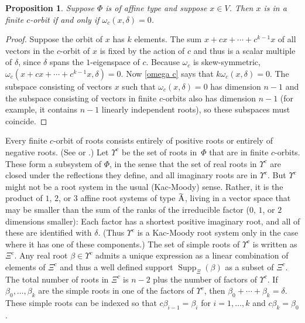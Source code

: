 \documentclass{amsart}
\newtheorem{proposition}{Proposition}[section]
\theoremstyle{definition}
\theoremstyle{remark}
\numberwithin{equation}{section}
\newcommand{\0}{{\mathbf{0}}}
\newcommand{\RSChar}{\Phi}
\newcommand{\RS}{\RSChar}
\newcommand{\RSTChar}{\Upsilon}
\newcommand{\RST}[1]{\RSTChar^{#1}}
\newcommand{\SimplesTChar}{\Xi}
\newcommand{\SimplesT}[1]{\SimplesTChar^{#1}}
\newcommand{\SuppT}{\operatorname{Supp}_\SimplesTChar}
\newcommand{\afftype}[1]{{\widetilde{\raisebox{0pt}[6pt][0pt]{#1}}}}
\newcommand{\sayN}[1]{\say[N]{#1}}
\begin{document}

\begin{proposition}\label{om del fin}
Suppose $\RS$ is of affine type and suppose $x\in V$.
Then $x$ is in a finite $c$-orbit if and only if $\omega_c(x,\delta)=0$.
\end{proposition}
\begin{proof}
Suppose the orbit of $x$ has $k$ elements.
The sum $x+cx+\cdots+c^{k-1}x$ of all vectors in the $c$-orbit of $x$ is fixed by the action of $c$ and thus is a scalar multiple of $\delta$, since $\delta$ spans the $1$-eigenspace of $c$.
Because $\omega_c$ is skew-symmetric, $\omega_c(x+cx+\cdots+c^{k-1}x,\delta)=0$.
Now \cref{omega c} says that $k\omega_c(x,\delta)=0$.
The subspace consisting of vectors $x$ such that $\omega_c(x,\delta)=0$ has dimension $n-1$ and the subspace consisting of vectors in finite $c$-orbits also has dimension $n-1$ (for example, it contains $n-1$ linearly independent roots), \sayN{Expand on that.}
so these subspaces must coincide.
\end{proof}


Every finite $c$-orbit of roots consists entirely of positive roots or entirely of negative roots.
(See \cite[Chapter~1]{Dlab-Ringel} or \cite[Theorem~1.2(5)]{afforb}.)
Let $\RST{c}$ be the set of roots in~$\RS$ that are in finite $c$-orbits.
These form a subsystem of $\RS$, in the sense that the set of real roots in $\RST{c}$ are closed under the reflections they define, and all imaginary roots are in $\RST{c}$.
But $\RST{c}$ might not be a root system in the usual (Kac-Moody) sense.
Rather, it is the product of $1$, $2$, or $3$ affine root systems of type $\afftype{A}$, living in a vector space that may be smaller than the sum of the ranks of the irreducible factor ($0$, $1$, or $2$ dimensions smaller):
Each factor has a shortest positive imaginary root, and all of these are identified with $\delta$.
(Thus $\RST{c}$ is a Kac-Moody root system only in the case where it has one of these components.)
The set of simple roots of $\RST{c}$ is written as $\SimplesT{c}$.
Any real root $\beta\in\RST{c}$ admits a unique expression as a linear combination of elements of $\SimplesT{c}$ and thus a well defined support $\SuppT(\beta)$ as a subset of $\SimplesT{c}$.
The total number of roots in $\SimplesT{c}$ is $n-2$ plus the number of factors of $\RST{c}$.
If $\beta_0,\ldots,\beta_k$ are the simple roots in one of the factors of $\RST{c}$, then $\beta_0+\cdots+\beta_k=\delta$.
These simple roots can be indexed so that $c\beta_{i-1}=\beta_i$ for $i=1,\ldots,k$ and $c\beta_k=\beta_0$.
\end{document}

